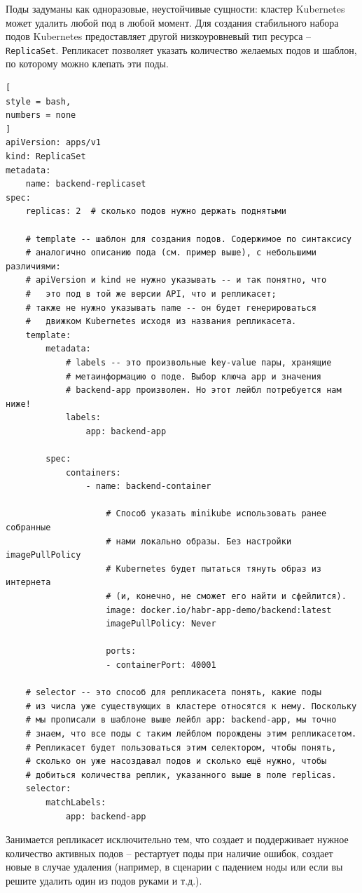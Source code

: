 \documentclass[%
	11pt,
	a4paper,
	utf8,
		]{article}
\begin{document}
Поды задуманы как одноразовые, неустойчивые сущности: кластер Kubernetes может удалить любой под в любой момент. Для создания стабильного набора подов Kubernetes предоставляет другой низкоуровневый тип ресурса -- \verb*|ReplicaSet|. Репликасет позволяет указать количество желаемых подов и шаблон, по которому можно клепать эти поды.
\begin{lstlisting}[
style = bash,
numbers = none
]
apiVersion: apps/v1
kind: ReplicaSet
metadata:
	name: backend-replicaset
spec:
	replicas: 2  # сколько подов нужно держать поднятыми

	# template -- шаблон для создания подов. Содержимое по синтаксису
	# аналогично описанию пода (см. пример выше), с небольшими различиями:
	# apiVersion и kind не нужно указывать -- и так понятно, что
	#   это под в той же версии API, что и репликасет;
	# также не нужно указывать name -- он будет генерироваться
	#   движком Kubernetes исходя из названия репликасета.
	template:
		metadata:
			# labels -- это произвольные key-value пары, хранящие 
			# метаинформацию о поде. Выбор ключа app и значения 
			# backend-app произволен. Но этот лейбл потребуется нам ниже!
			labels:
				app: backend-app

		spec:
			containers:
				- name: backend-container

					# Способ указать minikube использовать ранее собранные
					# нами локально образы. Без настройки imagePullPolicy
					# Kubernetes будет пытаться тянуть образ из интернета 
					# (и, конечно, не сможет его найти и сфейлится).
					image: docker.io/habr-app-demo/backend:latest
					imagePullPolicy: Never

					ports:
					- containerPort: 40001

	# selector -- это способ для репликасета понять, какие поды
	# из числа уже существующих в кластере относятся к нему. Поскольку
	# мы прописали в шаблоне выше лейбл app: backend-app, мы точно
	# знаем, что все поды с таким лейблом порождены этим репликасетом.
	# Репликасет будет пользоваться этим селектором, чтобы понять,
	# сколько он уже насоздавал подов и сколько ещё нужно, чтобы 
	# добиться количества реплик, указанного выше в поле replicas.
	selector:
		matchLabels:
			app: backend-app
\end{lstlisting}

Занимается репликасет исключительно тем, что создает и поддерживает нужное количество активных подов -- рестартует поды при наличие ошибок, создает новые в случае удаления (например, в сценарии с падением ноды или если вы решите удалить один из подов руками и т.д.).
\end{document}
